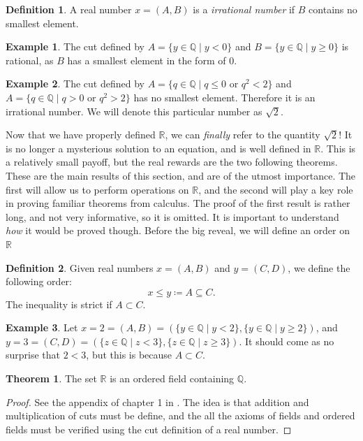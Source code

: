 \documentclass{article}
\newcommand{\R}{\mathbb{R}}
\newcommand{\Q}{\mathbb{Q}}
\theoremstyle{definition}
\newtheorem{theorem}{Theorem}[section]
\newtheorem{definition}{Definition}[section]
\newtheorem{example}{Example}[section]
\begin{document}
\begin{definition}
	A real number $ x=(A,B) $ is a \textit{\color{red}irrational number} if $ B $ contains no smallest element.
\end{definition}
\begin{example}
	The cut defined by $ A=\{y\in \Q \mid y<0\} $ and $ B=\{y\in\Q\mid y\ge 0\} $ is rational, as $ B $ has a smallest element in the form of $ 0 $.  
\end{example}
\begin{example}
	The cut defined by $A=\{q\in\Q\mid q\le 0\text{ or }q^2<2 \} $ and $ A=\{q\in\Q\mid q> 0\text{ or }q^2>2 \} $ has no smallest element. Therefore it is an irrational number. We will denote this particular number as $ \sqrt{2} $. 
\end{example}
Now that we have properly defined $ \R $, we can \textit{finally} refer to the quantity $ \sqrt{2} $! It is no longer a mysterious solution to an equation, and is well defined in $ \R $. This is a relatively small payoff, but the real rewards are the two following theorems. These are the main results of this section, and are of the utmost importance. The first will allow us to perform operations on $ \R $, and the second will play a key role in proving familiar theorems from calculus. The proof of the first result is rather long, and not very informative, so it is omitted. It is important to understand \textit{how} it would be proved though. Before the big reveal, we will define an order on $ \R $
\begin{definition}
	Given real numbers $ x=(A,B) $ and $ y=(C,D) $, we define the following order:$$x\le y\coloneqq A\subseteq C .$$ The inequality is strict if $ A\subset C $. 
\end{definition}
\begin{example}
	Let $ x=2=(A,B)=(\{y\in \Q \mid y<2\},\{y\in\Q\mid y\ge 2\})$, and $ y=3=(C,D)=(\{z\in \Q \mid z<3\},\{z\in\Q\mid z\ge 3\})$. It should come as no surprise that $ 2<3 $, but this is because $ A\subset C $.  
\end{example}
\begin{theorem}
	The set $ \R $ is an ordered field containing $ \Q $.
\end{theorem}
\begin{proof}
	See the appendix of chapter 1 in \cite{rudin}. The idea is that addition and multiplication of cuts must be define, and the all the axioms of fields and ordered fields must be verified using the cut definition of a real number. 
\end{proof}
\end{document}
